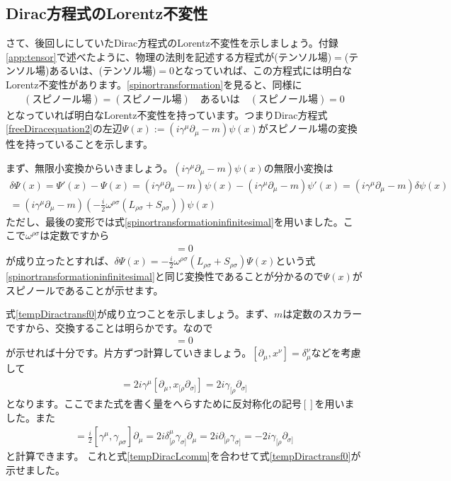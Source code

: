 \documentclass[report,paper=a4, fontsize=12pt, line_length=16cm, number_of_lines=33,dvipdfmx]{jlreq}
\numberwithin{equation}{chapter}
\newcommand{\del}{\partial}
\begin{document}
\subsection{Dirac方程式のLorentz不変性}
さて、後回しにしていたDirac方程式のLorentz不変性を示しましょう。付録\ref{app:tensor}で述べたように、物理の法則を記述する方程式が(テンソル場)$=$(テンソル場)あるいは、(テンソル場)$=0$となっていれば、この方程式には明白なLorentz不変性があります。\eqref{spinortransformation}を見ると、同様に
\begin{align}
  (\text{スピノール場})=(\text{スピノール場})\text{　あるいは　}(\text{スピノール場})=0
\end{align}
となっていれば明白なLorentz不変性を持っています。つまりDirac方程式\eqref{freeDiracequation2}の左辺$\Psi(x):=(i\gamma^{\mu}\del_{\mu}-m)\psi(x)$がスピノール場の変換性を持っていることを示します。

まず、無限小変換からいきましょう。$(i\gamma^{\mu}\del_{\mu}-m)\psi(x)$の無限小変換は
\begin{align}
  \delta \Psi(x)=
  \Psi'(x)-\Psi(x)=
  (i\gamma^{\mu}\del_{\mu}-m)\psi(x)-
  (i\gamma^{\mu}\del_{\mu}-m)\psi'(x)
  = (i\gamma^{\mu}\del_{\mu}-m)\delta \psi(x)\nonumber\\
  =(i\gamma^{\mu}\del_{\mu}-m)(-\frac{i}{2}\omega^{\rho\sigma}(L_{\rho\sigma}+S_{\rho\sigma}))\psi(x)
\end{align}
ただし、最後の変形では式\eqref{spinortransformationinfinitesimal}を用いました。ここで$\omega^{\rho\sigma}$は定数ですから
\begin{align}
  [(\gamma^{\mu}\del_{\mu}-m), L_{\rho\sigma}+S_{\rho\sigma})]=0\label{tempDiractransf0}
\end{align}
が成り立ったとすれば、$\delta \Psi(x)=-\frac{i}{2}\omega^{\rho\sigma}(L_{\rho\sigma}+S_{\rho\sigma})\Psi(x)$という式\eqref{spinortransformationinfinitesimal}と同じ変換性であることが分かるので$\Psi(x)$がスピノールであることが示せます。

式\eqref{tempDiractransf0}が成り立つことを示しましょう。まず、$m$は定数のスカラーですから、交換することは明らかです。なので
\begin{align}
  [\gamma^{\mu}\del_{\mu},L_{\rho\sigma}+S_{\rho\sigma}]=0
\end{align}
が示せれば十分です。片方ずつ計算していきましょう。$[\del_{\mu},x^{\nu}]=\delta_{\mu}^{\nu}$などを考慮して
\begin{align}
  [\gamma^{\mu}\del_{\mu},L_{\mu\nu}]
  =2i\gamma^{\mu}[\del_{\mu},x_{[\rho}\del_{\sigma]}]
  =2i\gamma_{[\rho}\del_{\sigma]}\label{tempDiracLcomm}
\end{align}
となります。ここでまた式を書く量をへらすために反対称化の記号$[]$を用いました。また
\begin{align}
  [\gamma^{\mu}\del_{\mu},S_{\rho\sigma}]=\frac{i}{2}[\gamma^{\mu},\gamma_{\rho\sigma}]\del_{\mu}
  =2i\delta^{\mu}_{[\rho}\gamma_{\sigma]}\del_{\mu}
  =2i\del_{[\rho}\gamma_{\sigma]} 
  =-2i\gamma_{[\rho}\del_{\sigma]} 
\end{align}
と計算できます。
これと式\eqref{tempDiracLcomm}を合わせて式\eqref{tempDiractransf0}が示せました。
\end{document}
